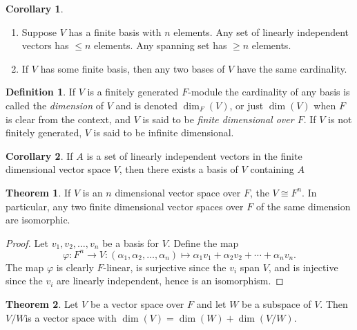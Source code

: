 \documentclass[10pt]{article}
\theoremstyle{definition}
\newtheorem{thm}{Theorem}[section]
\newtheorem*{cor}{Corollary}
\newtheorem*{defn}{Definition}
\newcommand{\nl}{\vspace{7em}}
\newcommand{\ra}{\rightarrow}
\newcommand{\al}{\alpha}
\newcommand{\vphi}{\varphi}
\begin{document}
\nl

\begin{cor}\nl
\begin{enumerate}
\item Suppose $V$ has a finite basis with $n$ elements. Any set of linearly independent vectors has $\leq n$ elements. Any spanning set has $\geq n$ elements.
\item If $V$ has some finite basis, then any two bases of $V$ have the same cardinality.
\end{enumerate}
\end{cor}

\nl

\begin{defn}
If $V$ is a finitely generated $F$-module the cardinality of any basis is called the \textit{dimension} of $V$ and is denoted $\dim_F(V)$, or just $\dim(V)$ when $F$ is clear from the context, and $V$ is said to be \textit{finite dimensional over $F$}. If $V$ is not finitely generated, $V$ is said to be infinite dimensional.
\end{defn}

\nl

\begin{cor}
If $A$ is a set of linearly independent vectors in the finite dimensional vector space $V$, then there exists a basis of $V$ containing $A$
\end{cor}

\nl

\begin{thm}
If $V$ is an $n$ dimensional vector space over $F$, the $V\cong F^n$. In particular, any two finite dimensional vector spaces over $F$ of the same dimension are isomorphic.
\end{thm}

\begin{proof}
Let $v_1,v_2,\ldots,v_n$ be a basis for $V$. Define the map 
\[\vphi:F^n\ra V:(\al_1,\al_2,\ldots,\al_n)\mapsto\al_1v_1 + \al_2v_2+\cdots+\al_n v_n.\]
The map $\vphi$ is clearly $F$-linear, is surjective since the $v_i$ span $V$, and is injective since the $v_i$ are linearly independent, hence is an isomorphism.
\end{proof}

\nl

\begin{thm}
Let $V$ be a vector space over $F$ and let $W$ be a subspace of $V$. Then $V/W$is a vector space with $\dim(V) = \dim(W) + \dim(V/W)$.
\end{thm}
\end{document}
